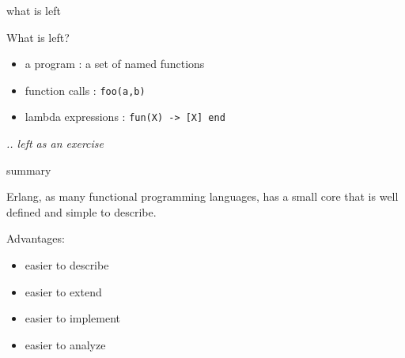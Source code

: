 \begin{frame}{what is left}

What is left?

\pause\vspace{20pt}
\begin{itemize}
\item a program : a set of named functions
\item function calls :  {\tt foo(a,b)} 
\item lambda expressions : {\tt fun(X) -> [X] end}
\end{itemize}
        
\pause\vspace{20pt}
{\em .. left as an exercise}

\end{frame}

\begin{frame}{summary}

Erlang, as many functional programming languages, has a small core that is
well defined and simple to describe.

\pause\vspace{20pt}
Advantages: 
\pause
\begin{itemize}
\item easier to describe 
\pause
\item easier to extend 
\pause
\item easier to implement 
\pause
\item easier to analyze
\end{itemize}

\end{frame}




